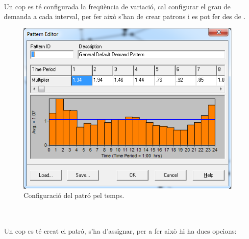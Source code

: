\documentclass[12pt]{article}
\begin{document}
\\\\Un cop es té configurada la freqüència de variació, cal configurar el grau de demanda a cada interval, per fer això s'han de crear patrons i es pot fer des de . 
\pagebreak
\begin{figure}
	\centering
	\includegraphics[scale=.5]{imatges/epanet/16.png}
	\caption{Configuració del patró pel temps.}
\end{figure}
\\\\Un cop es té creat el patró, s'ha d'assignar, per a fer això hi ha dues opcions:
\end{document}

